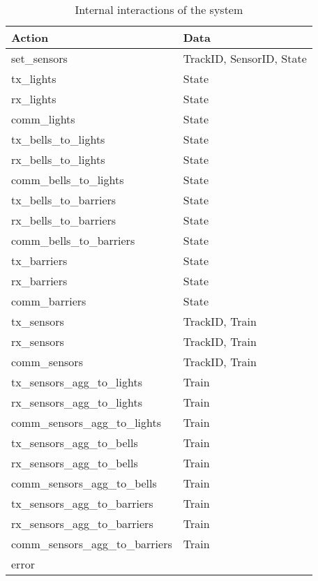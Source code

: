 \documentclass[final]{report}
\begin{document}
\begin{table}[H]
    \centering
    \caption{Internal interactions of the system}
    \label{tab:internal-actions}
    \begin{tabular}{ll}
        \toprule
        \textbf{Action} & \textbf{Data} \\ 
        \midrule
        set\_sensors & TrackID, SensorID, State \\
        \midrule
        tx\_lights & State \\
        rx\_lights & State \\
        comm\_lights & State \\
        tx\_bells\_to\_lights & State \\
        rx\_bells\_to\_lights & State \\
        comm\_bells\_to\_lights & State \\
        tx\_bells\_to\_barriers & State \\
        rx\_bells\_to\_barriers & State \\
        comm\_bells\_to\_barriers & State \\
        tx\_barriers & State \\
        rx\_barriers & State \\
        comm\_barriers & State \\
        \midrule
        tx\_sensors & TrackID, Train \\
        rx\_sensors & TrackID, Train \\
        comm\_sensors & TrackID, Train \\
        \midrule
        tx\_sensors\_agg\_to\_lights & Train \\
        rx\_sensors\_agg\_to\_lights & Train \\
        comm\_sensors\_agg\_to\_lights & Train \\
        tx\_sensors\_agg\_to\_bells & Train \\
        rx\_sensors\_agg\_to\_bells & Train \\
        comm\_sensors\_agg\_to\_bells & Train \\
        tx\_sensors\_agg\_to\_barriers & Train \\
        rx\_sensors\_agg\_to\_barriers & Train \\
        comm\_sensors\_agg\_to\_barriers & Train \\
        \midrule
        error & \\
        \bottomrule
    \end{tabular}
    


\end{table}
\end{document}

